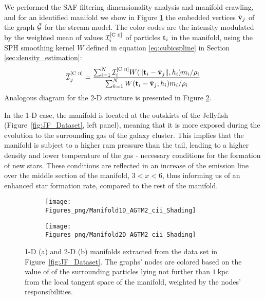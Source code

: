 We performed the SAF filtering dimensionality analysis and manifold crawling, and for an identified manifold we show in Figure \ref{subfig:1dManGraph} the embedded vertices
$\bar{\boldsymbol{\mathbf{v}}}_j$ of the graph $\bar{\cal G}$
for the stream model.
The color codes are the intensity modulated by the weighted mean of \cii{} values $\mathcal{I}^{\text{[C~\textsc{ii}]{}}}_i$ of particles $\boldsymbol{\mathbf{t}}_i$ in the manifold, using the SPH smoothing kernel $W$ defined in equation \eqref{eq:cubicspline} in Section \ref{sec:density_estimation}:
\begin{equation}\label{eq:WeightedVar}
  \overline{\mathcal{I}}^{\text{[C~\textsc{ii}]{}}}_j = \frac{\sum_{i=1}^{N} \mathcal{I}^{\text{[C~\textsc{ii}]{}}}_i W (\norm{\boldsymbol{\mathbf{t}}_i - \bar{\boldsymbol{\mathbf{v}}}_j}, h_i) m_i/\rho_i }{\sum_{k=1}^{N} W ({\boldsymbol{\mathbf{t}}_i - \bar{\boldsymbol{\mathbf{v}}}_j}, h_i) m_i/ \rho_i}
\end{equation}
Analogous diagram for the 2-D structure is presented in Figure \ref{subfig:2dManGraph}.

In the 1-D case, the manifold is located at the outskirts of the Jellyfish (Figure~\ref{fig:JF_Dataset}, left panel),
meaning that it is more exposed during the evolution to the surrounding gas of the galaxy cluster.
This implies that the manifold is subject to a higher ram pressure than the tail, leading to a higher density and lower temperature of the gas - necessary conditions for the formation of new stars.
These conditions are reflected in an increase of the \cii{} emission line over the middle section of the manifold, $3 < x < 6$, thus informing us of an enhanced star formation rate, compared to the rest of the manifold.
\begin{figure}[ht]
\centering
\begin{subfigure}[t]{0.48\textwidth}
 \caption{}
 \label{subfig:1dManGraph}
 \texttt{[image: Figures\_png/Manifold1D\_AGTM2\_cii\_Shading]}
\end{subfigure}
\begin{subfigure}[t]{0.49\textwidth}
 \caption{}
 \label{subfig:2dManGraph}
 \texttt{[image: Figures\_png/Manifold2D\_AGTM2\_cii\_Shading]}
\end{subfigure}
\caption{1-D (a) and 2-D (b) manifolds extracted from the data set in Figure~\ref{fig:JF_Dataset}.
The graphs' nodes are colored based on the value of \cii{} of the surrounding particles lying not further than $\mathrm{1~kpc}$ from the local tangent space of the manifold, weighted by the nodes' responsibilities.}
\label{fig:Man2D}
\end{figure}

